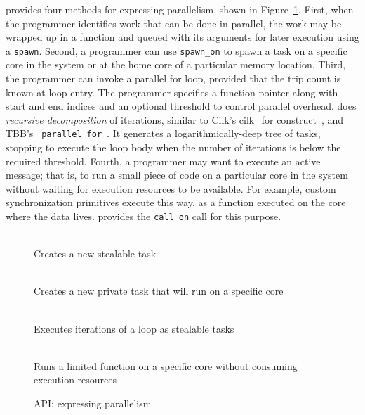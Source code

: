 \Grappa provides four methods for expressing parallelism, shown in
Figure~\ref{fig:expressing-parallelism}. First, when the programmer identifies
work that can be done in parallel, the work may be wrapped up in a function
and queued with its arguments for later execution using a \texttt{spawn}.
Second, a programmer can use \texttt{spawn\_on} to spawn a task on a specific
core in the system or at the home core of a particular memory location. Third,
the programmer can invoke a parallel for loop, provided that the trip count is
known at loop entry. The programmer specifies a function pointer along with
start and end indices and an optional threshold to control parallel overhead.
\Grappa does {\em recursive decomposition} of iterations, similar to Cilk's
cilk\_for construct~\cite {cilkforimplementation}, and TBB's {\tt
parallel\_for}~\cite{intel_tbb}. It generates a logarithmically-deep tree of
tasks, stopping to execute the loop body when the number of iterations is
below the required threshold. Fourth, a programmer may want to execute an active message; that is, to run a
small piece of code on a particular core in the system without waiting for
execution resources to be available. For example, custom synchronization
primitives execute this way, as a function executed on the core where the data
lives. \Grappa provides the \texttt{call\_on} call for this purpose.

\begin{figure}[htbp]
  \begin{center}
    \begin{description}\small
    \item[ \texttt{spawn( void (*fp)(args) )} ] \hfill \\
      Creates a new stealable task
    \item[ \texttt{spawn\_on( core, (*fp)(args) )} ] \hfill \\
      Creates a new private task that will run on a specific core 
    \item[ \texttt{parallel\_for( (*fp)(args), start, end )} ] \hfill \\
      Executes iterations of a loop as stealable tasks 
    \item[ \texttt{call\_on( core, (*fp)(args) )} ] \hfill \\ 
      Runs a limited function on a specific core without consuming
      \Grappa execution resources 
    \end{description}
    \begin{minipage}{0.95\columnwidth}
      \caption{\label{fig:expressing-parallelism} \Grappa API: expressing parallelism
      } %
    \end{minipage}
  \end{center}
\end{figure}

